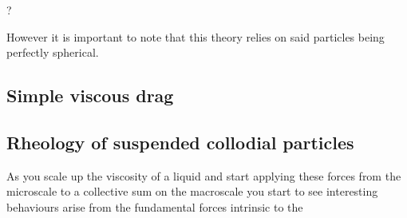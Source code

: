 ?


However it is important to note that this theory relies on said particles being perfectly spherical.

\subsection{Simple viscous drag}
    
\newpage

    
\subsection{Rheology of suspended collodial particles}

As you scale up the viscosity of a liquid and start applying these forces from the microscale to a collective sum on the macroscale you start to see interesting behaviours arise from the fundamental forces intrinsic to the 

